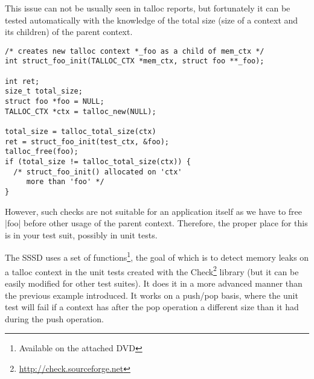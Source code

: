 This issue can not be usually seen in talloc reports, but fortunately it can be
tested automatically with the knowledge of the total size (size of a context and
its children) of the parent context.

\begin{lstlisting}[caption={Memory leaks detection \#1},
morekeywords={talloc_total_size,talloc_free}]
/* creates new talloc context *_foo as a child of mem_ctx */
int struct_foo_init(TALLOC_CTX *mem_ctx, struct foo **_foo);

int ret;
size_t total_size;
struct foo *foo = NULL;
TALLOC_CTX *ctx = talloc_new(NULL);

total_size = talloc_total_size(ctx)
ret = struct_foo_init(test_ctx, &foo);
talloc_free(foo);
if (total_size != talloc_total_size(ctx)) {
  /* struct_foo_init() allocated on 'ctx'
     more than 'foo' */
}
\end{lstlisting}

\noindent
However, such checks are not suitable for an application itself as we have to
free |foo| before other usage of the parent context. Therefore, the proper place
for this is in your test suit, possibly in unit tests.

The SSSD uses a set of functions\footnote{Available on the attached DVD}, the
goal of which is to detect memory leaks on a talloc context in the unit tests
created with the Check\footnote{\url{http://check.sourceforge.net}} library
(but it can be easily modified for other test suites). It does it in a more
advanced manner than the previous example introduced. It works on a push/pop
basis, where the unit test will fail if a context has after the pop operation a
different size than it had during the push operation.

